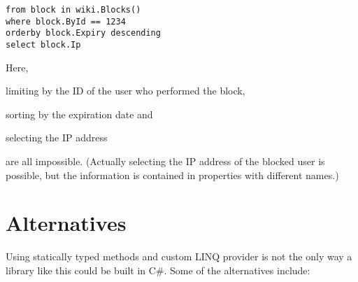 \begin{lstlisting}
from block in wiki.Blocks()
where block.ById == 1234
orderby block.Expiry descending
select block.Ip
\end{lstlisting}

Here,
\begin{compactitem}
\item limiting by the ID of the user who performed the block,
\item sorting by the expiration date and
\item selecting the \ac{IP} address
\end{compactitem}
are all impossible.
(Actually selecting the \ac{IP} address of the blocked user is possible,
but the information is contained in properties with different names.)

\section{Alternatives}
\label{alternatives}

Using statically typed methods and custom LINQ provider is not the only way a library like this
could be built in C\#.
Some of the alternatives include:

